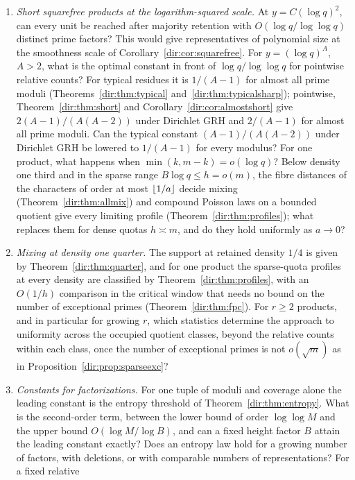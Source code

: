 \begin{enumerate}
\item \emph{Short squarefree products at the logarithm-squared scale.} At $y=C(\log q)^2$, can
 every unit be reached after majority retention with $O(\log q/\log\log q)$ distinct prime
 factors? This would give representatives of polynomial size at the smoothness scale of
 Corollary~\ref{dir:cor:squarefree}. For $y=(\log q)^A$, $A>2$, what is the optimal constant in
 front of $\log q/\log\log q$ for pointwise relative counts? For typical residues it is $1/(A-1)$ for
 almost all prime moduli (Theorems~\ref{dir:thm:typical} and~\ref{dir:thm:typicalsharp}); pointwise,
 Theorem~\ref{dir:thm:short} and Corollary~\ref{dir:cor:almostshort} give $2(A-1)/(A(A-2))$ under
 Dirichlet GRH and $2/(A-1)$ for almost all prime moduli. Can the typical constant
 $(A-1)/(A(A-2))$ under Dirichlet GRH be lowered to $1/(A-1)$ for every modulus? For one product,
 what happens when $\min(k,m-k)=o(\log q)$? Below density one third and in the sparse range
 $B\log q\le h=o(m)$, the fibre distances of the characters of order at most $\lfloor1/a\rfloor$ decide mixing
 (Theorem~\ref{dir:thm:allmix}) and compound Poisson laws on a bounded quotient give every limiting
 profile (Theorem~\ref{dir:thm:profiles}); what replaces them for dense quotas $h\asymp m$, and do they
 hold uniformly as $a\to0$?
\item \emph{Mixing at density one quarter.} The support at retained density $1/4$ is given by
 Theorem~\ref{dir:thm:quarter}, and for one product the sparse-quota profiles at every density are
 classified by Theorem~\ref{dir:thm:profiles}, with an $O(1/h)$ comparison in the critical window that
 needs no bound on the number of exceptional primes (Theorem~\ref{dir:thm:fpc}). For $r\ge2$ products,
 and in particular for growing $r$, which statistics determine the approach to uniformity across the
 occupied quotient classes, beyond the relative counts within each class, once the number of exceptional
 primes is not $o(\sqrt m)$ as in Proposition~\ref{dir:prop:sparseexc}?
\item \emph{Constants for factorizations.} For one tuple of moduli and coverage alone the leading
 constant is the entropy threshold of Theorem~\ref{dir:thm:entropy}. What is the second-order term,
 between the lower bound of order $\log\log M$ and the upper bound $O(\log M/\log B)$, and can a fixed
 height factor $B$ attain the leading constant exactly? Does an entropy law hold for a growing number
 of factors, with deletions, or with comparable numbers of representations? For a fixed relative

\end{enumerate}
